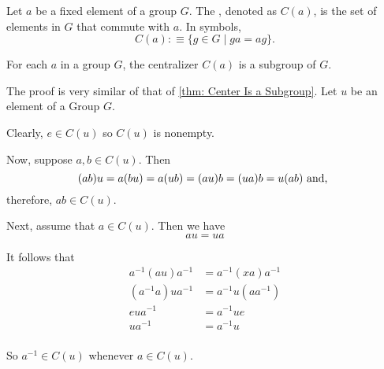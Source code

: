 \begin{mydef}[Centralizer of $a$ in $G$]
  Let $a$ be a fixed element of a group $G$. The , denoted as $C(a)$, is the set of elements in $G$ that commute with $a$. In symbols,
  \begin{equation}
    C(a) :\equiv \{g \in G \mid ga = ag \}.
  \end{equation}
\end{mydef}
\begin{thm}[$C(a)$ is a Subgroup]
  For each $a$ in a group $G$, the centralizer $C(a)$ is a subgroup of $G$.
\end{thm}
\begin{prf}
  The proof is very similar of that of \ref{thm: Center Is a Subgroup}.
  Let $u$ be an element of a Group $G$.

  Clearly, $e \in C(u)$ so $C(u)$ is nonempty.

  Now, suppose $a,b \in C(u).$ Then
  \begin{equation}
    (ab)u = a(bu) = a(ub) = (au) b = (ua)b = u (ab) $ and, $
  \end{equation}
  therefore, $ab \in C(u)$.

  Next, assume that $a \in C(u)$. Then we have
  \begin{equation}
    \label{eq: au=ua}
    au = ua
  \end{equation}

  It follows that
  \begin{equation}
  \begin{aligned}
    a^{-1}(au)a^{-1}  &=a^{-1}(xa)a^{-1}\\
    (a^{-1}a)ua^{-1}&=a^{-1}u(aa^{-1}) \\
    eua^{-1}&=a^{-1}ue \\
    ua^{-1}&=a^{-1}u \\
  \end{aligned}
  \end{equation}

  So $a^{-1} \in C(u)$ whenever $a \in C(u)$.
\end{prf}